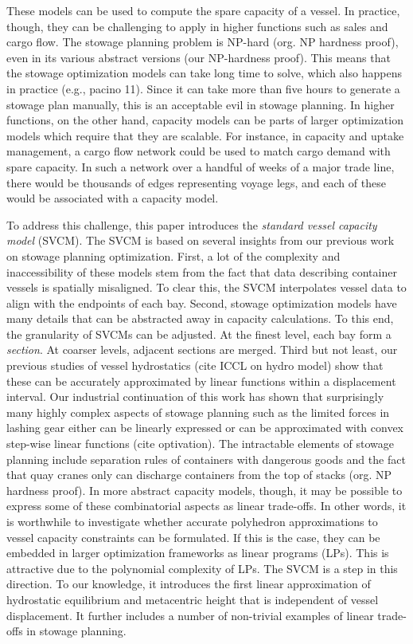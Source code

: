 \documentclass[runningheads]{llncs}
\begin{document}
These models can be used to compute the spare capacity of a vessel. In practice, though, they can be challenging to apply in higher functions such as sales and cargo flow. The stowage planning problem is NP-hard (org. NP hardness proof), even in its various abstract versions (our NP-hardness proof). This means that the stowage optimization models can take long time to solve, which also happens in practice (e.g., pacino 11). Since it can take more than five hours to generate a stowage plan manually, this is an acceptable evil in stowage planning. In higher functions, on the other hand, capacity models can be parts of larger optimization models which require that they are scalable. For instance, in capacity and uptake management, a cargo flow network could be used to match cargo demand with spare capacity. In such a network over a handful of weeks of a major trade line, there would be thousands of edges representing voyage legs, and each of these would be associated with a capacity model. 

To address this challenge, this paper introduces the {\em standard vessel capacity model} (SVCM). The SVCM is based on several insights from our previous work on stowage planning optimization. First, a lot of the complexity and inaccessibility of these models stem from the fact that data describing container vessels is spatially misaligned. To clear this, the SVCM interpolates vessel data to align with the endpoints of each bay. Second, stowage optimization models have many details that can be abstracted away in capacity calculations. To this end, the granularity of SVCMs can be adjusted. At the finest level, each bay form a {\em section}. At coarser levels, adjacent sections are merged. Third but not least, our previous studies of vessel hydrostatics (cite ICCL on hydro model) show that these can be accurately approximated by linear functions within a displacement interval. Our industrial continuation of this work has shown that surprisingly many highly complex aspects of stowage planning such as the limited forces in lashing gear either can be linearly expressed or can be approximated with convex step-wise linear functions (cite optivation). The intractable elements of stowage planning include separation rules of containers with dangerous goods and the fact that quay cranes only can discharge containers from the top of stacks (org. NP hardness proof). In more abstract capacity models, though, it may be possible to express some of these combinatorial aspects as linear trade-offs. In other words, it is worthwhile to investigate whether accurate polyhedron approximations to vessel capacity constraints can be formulated. If this is the case, they can be embedded in larger optimization frameworks as linear programs (LPs). This is attractive due to the polynomial complexity of LPs. The SVCM is a step in this direction. To our knowledge, it introduces the first linear approximation of hydrostatic equilibrium and metacentric height that is independent of vessel displacement. It further includes a number of non-trivial examples of linear trade-offs in stowage planning.
\end{document}
